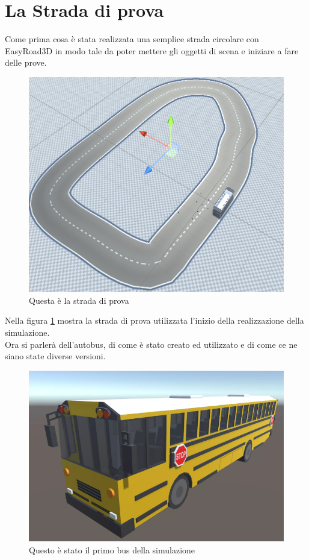 \documentclass[12pt, openany]{book}
\begin{document}
	\section{La Strada di prova}
	Come prima cosa è stata realizzata una semplice strada circolare con EasyRoad3D in modo tale da poter mettere gli oggetti di scena e iniziare a fare delle prove.
	\begin{figure}[H]
		\centering
		\includegraphics[width=0.7\linewidth]{"Immagini/StradaBase.png"}
		\caption{Questa è la strada di prova}
		\label{fig:StradaBase}
	\end{figure}
	Nella figura \ref{fig:StradaBase} mostra la strada di prova utilizzata l'inizio della realizzazione della simulazione.\\
	Ora si parlerà dell'autobus, di come è stato creato ed utilizzato e di come ce ne siano state diverse versioni. 
	\begin{figure}[H]
		\centering
		\includegraphics[width=0.7\linewidth]{"Immagini/SchoolBus.png"}
		\caption{Questo è stato il primo bus della simulazione}
		\label{fig:SchoolBus}
	\end{figure}
\end{document}
